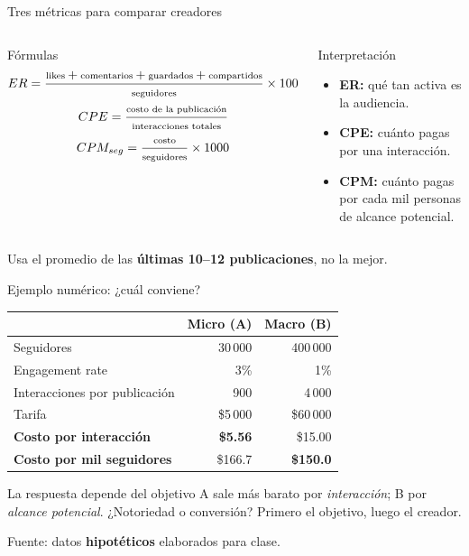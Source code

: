 \documentclass[aspectratio=169,xcolor=dvipsnames]{beamer}
\newcommand{\fuente}[1]{{\tiny\color{IPNgris}Fuente: #1}}
\begin{document}
\begin{frame}{Tres métricas para comparar creadores}
\begin{columns}[T]
  \begin{block}{Fórmulas}
    \small
    \[ \scriptsize ER = \frac{\text{likes}+\text{comentarios}+\text{guardados}+\text{compartidos}}{\text{seguidores}}\times 100 \]
    \[ \scriptsize CPE = \frac{\text{costo de la publicación}}{\text{interacciones totales}} \]
    \[ \scriptsize CPM_{seg} = \frac{\text{costo}}{\text{seguidores}}\times 1000 \]
  \end{block}
  \begin{exampleblock}{Interpretación}
    \small
    \begin{itemize}
      \item \textbf{ER:} qué tan activa es la audiencia.
      \item \textbf{CPE:} cuánto pagas por una interacción.
      \item \textbf{CPM:} cuánto pagas por cada mil personas de alcance potencial.
    \end{itemize}
  \end{exampleblock}
\end{columns}
\vspace{2pt}
\centering\scriptsize Usa el promedio de las \textbf{últimas 10–12 publicaciones}, no la mejor.
\end{frame}

\begin{frame}{Ejemplo numérico: ¿cuál conviene?}
\centering
\small
\begin{tabular}{@{}lrr@{}}
\toprule
\rowcolor{IPNguindaClara} & \textbf{Micro (A)} & \textbf{Macro (B)}\\
\midrule
Seguidores & 30\,000 & 400\,000\\
Engagement rate & 3\% & 1\%\\
Interacciones por publicación & 900 & 4\,000\\
Tarifa & \$5\,000 & \$60\,000\\
\midrule
\textbf{Costo por interacción} & \textbf{\$5.56} & \$15.00\\
\textbf{Costo por mil seguidores} & \$166.7 & \textbf{\$150.0}\\
\bottomrule
\end{tabular}
\vspace{6pt}
\begin{alertblock}{La respuesta depende del objetivo}
  \small A sale más barato por \emph{interacción}; B por \emph{alcance potencial}. ¿Notoriedad o conversión? Primero el objetivo, luego el creador.
\end{alertblock}
\fuente{datos \textbf{hipotéticos} elaborados para clase.}
\end{frame}
\end{document}
